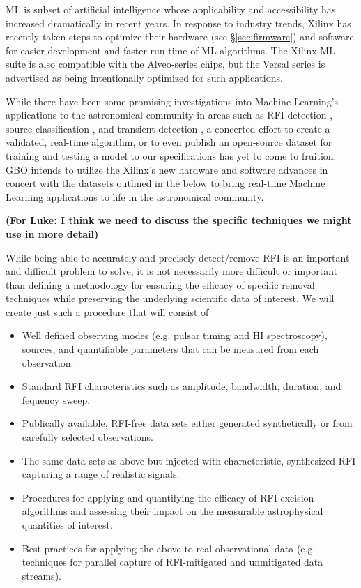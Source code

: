 \documentclass[10pt]{myNSF}
\begin{document}
 ML is subset of artificial intelligence
whose applicability and accessibility has increased dramatically in
recent years. In response to industry trends, Xilinx has recently
taken steps to optimize their hardware (see \S\ref{sec:firmware}) and
software for easier development and faster run-time of ML algorithms.
The Xilinx ML-suite is also compatible with the Alveo-series chips,
but the Versal series is advertised as being intentionally optimized
for such applications.

While there have been some promising investigations into Machine
Learning’s applications to the astronomical community in areas such as
RFI-detection \citep{wol16}, source classification
\citep{zbm+14,at17}, and transient-detection \citep{zgf+18}, a
concerted effort to create a validated, real-time algorithm, or to
even publish an open-source dataset for training and testing a model
to our specifications has yet to come to fruition.  GBO intends to
utilize the Xilinx's new hardware and software advances in concert
with the datasets outlined in the below to bring real-time Machine
Learning applications to life in the astronomical community.

\textbf{(For Luke: I think we need to discuss the specific techniques
  we might use in more detail)}

While being able to accurately and precisely detect/remove RFI is an
important and difficult problem to solve, it is not necessarily more
difficult or important than defining a methodology for ensuring the
efficacy of specific removal techniques while preserving the
underlying scientific data of interest.  We will create just such a
procedure that will consist of
\begin{itemize}
\item{Well defined observing modes (e.g. pulsar timing and H{\sc I}
    spectroscopy), sources, and quantifiable parameters that can be
    measured from each observation.}
\item{Standard RFI characteristics such as amplitude, bandwidth,
    duration, and fequency sweep.}
\item{Publically available, RFI-free data sets either generated
    synthetically or from carefully selected observations.}
\item{The same data sets as above but injected with characteristic,
    synthesized RFI capturing a range of realistic signals.}
\item{Procedures for applying and quantifying the efficacy of RFI
    excision algorithms and assessing their impact on the measurable
    astrophysical quantities of interest.}
\item{Best practices for applying the above to real observational data
    (e.g. techniques for parallel capture of RFI-mitigated and
    unmitigated data streams).}
\end{itemize}
\end{document}

